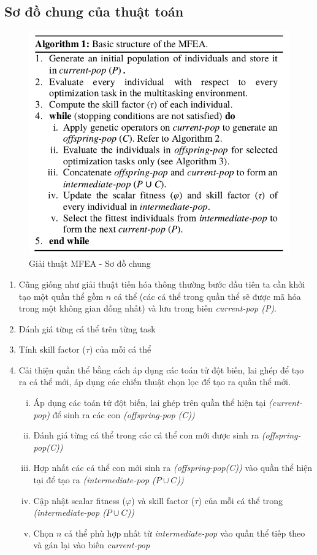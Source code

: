 \documentclass[a4paper,12pt]{report}
\begin{document}
\subsection{Sơ đồ chung của thuật toán}
\begin{figure}[H]
\centering 
\includegraphics[scale=0.8]{al1.png}
\caption{Giải thuật MFEA - Sơ đồ chung}
\end{figure}
\begin{enumerate}
\item Cũng giống như giải thuật tiến hóa thông thường bước đầu tiên ta cần khởi tạo một quần thể gồm $n$ cá thể (các cá thể trong quần thể sẽ được mã hóa trong một không gian đồng nhất) và lưu trong biến \emph{current-pop (P)}.
\item Đánh giá từng cá thể trên từng task 
\item Tính skill factor ($\tau$) của mỗi cá thể
\item Cải thiện quần thể bằng cách áp dụng các toán tử đột biến, lai ghép để tạo ra cá thể mới, áp dụng các chiến thuật chọn lọc để tạo ra quần thể mới. 
\begin{enumerate}[i.]
\item Áp dụng các toán tử đột biến, lai ghép trên quần thể hiện tại  \emph{(current-pop)} để sinh ra các con \emph{(offspring-pop (C))}
\item Đánh giá từng cá thể trong các cá thể con mới được sinh ra \emph{(offspring-pop(C))} 
\item Hợp nhất các cá thể con mới sinh ra \emph{(offspring-pop(C))} vào quần thể hiện tại để tạo ra \emph{(intermediate-pop ($P \cup C$))} 
\item Cập nhật scalar fitness ($\varphi$) và skill factor ($\tau$) của mỗi cá thể trong \emph{(intermediate-pop ($P \cup C$))}
\item Chọn $n$ cá thể phù hợp nhất từ \emph{intermediate-pop} vào quần thể tiếp theo và gán lại vào biến \emph{current-pop}
\end{enumerate}
\end{enumerate} 
\end{document}
